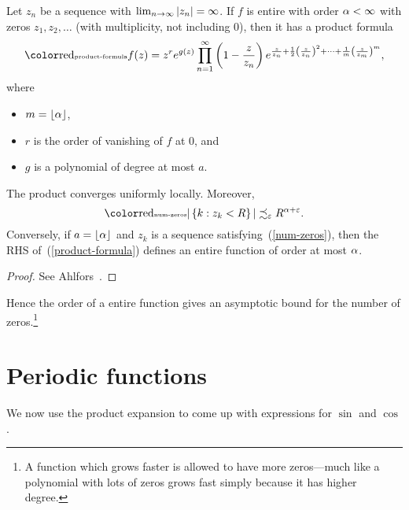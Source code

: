 \begin{thm}[Hadamard]
Let $z_n$ be a sequence with $\lim_{n\to \infty} |z_n|=\infty$.
If $f$ is entire with order $\alpha<\infty$ with zeros $z_1,z_2,\ldots$ (with multiplicity, not including 0), then it has a product formula
\begin{equation}\llabel{product-formula}
f(z)=z^re^{g(z)} \prod_{n=1}^{\iy} \pa{1-\frac{z}{z_n}}e^{
\frac{z}{z_n}+\rc2 \pf{z}{z_n}^2+\cdots +\rc{m}\pf{z}{z_m}^{m}
},
\end{equation}
where
\begin{itemize}
\item $m=\left\lfloor {\alpha}\right\rfloor$,
\item $r$ is the order of vanishing of $f$ at 0, and
\item $g$ is a polynomial of degree at most $a$.
\end{itemize}
The product converges uniformly locally. Moreover, 
\begin{equation}\llabel{num-zeros}
|\set{k}{z_k<R}|\precsim_{\ep} R^{\al+\ep}.
\end{equation}
Conversely, if $a=\left\lfloor {\alpha}\right\rfloor$ and $z_k$ is a sequence satisfying~(\ref{num-zeros}), then the RHS of~(\ref{product-formula}) defines an entire function of order at most $\alpha$.
\end{thm}
\begin{proof}
See Ahlfors~\cite[p. 195]{Ah79}.
\end{proof}
Hence the order of a entire function gives an asymptotic bound for the number of zeros.\footnote{A function which grows faster is allowed to have more zeros---much like a polynomial with lots of zeros grows fast simply because it has higher degree.}


\section{Periodic functions}

We now use the product expansion to come up with expressions for $\sin$ and $\cos$.

